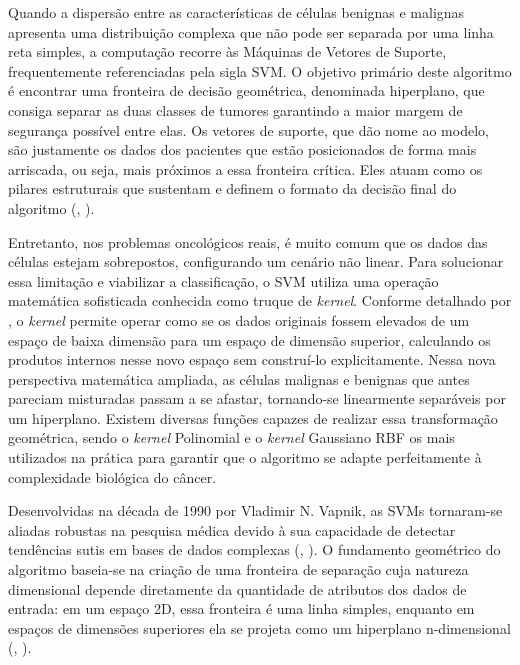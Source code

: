 \documentclass[
    12pt
    ,oneside
    ,a4paper
    ,chapter=TITLE
    ,section=TITLE
    ,sumario=abnt-6027-2012
    ,english,brazil]{abntex2} %
\begin{document}
Quando a dispersão entre as características de células benignas e malignas apresenta uma distribuição complexa que não pode ser separada por uma linha reta simples, a computação recorre às Máquinas de Vetores de Suporte, frequentemente referenciadas pela sigla SVM. O objetivo primário deste algoritmo é encontrar uma fronteira de decisão geométrica, denominada hiperplano, que consiga separar as duas classes de tumores garantindo a maior margem de segurança possível entre elas. Os vetores de suporte, que dão nome ao modelo, são justamente os dados dos pacientes que estão posicionados de forma mais arriscada, ou seja, mais próximos a essa fronteira crítica. Eles atuam como os pilares estruturais que sustentam e definem o formato da decisão final do algoritmo (, \citeyear{Bishop2006}).

Entretanto, nos problemas oncológicos reais, é muito comum que os dados das células estejam sobrepostos, configurando um cenário não linear. Para solucionar essa limitação e viabilizar a classificação, o SVM utiliza uma operação matemática sofisticada conhecida como truque de \textit{kernel}. Conforme detalhado por , o \textit{kernel} permite operar como se os dados originais fossem elevados de um espaço de baixa dimensão para um espaço de dimensão superior, calculando os produtos internos nesse novo espaço sem construí-lo explicitamente. Nessa nova perspectiva matemática ampliada, as células malignas e benignas que antes pareciam misturadas passam a se afastar, tornando-se linearmente separáveis por um hiperplano. Existem diversas funções capazes de realizar essa transformação geométrica, sendo o \textit{kernel} Polinomial e o \textit{kernel} Gaussiano RBF os mais utilizados na prática para garantir que o algoritmo se adapte perfeitamente à complexidade biológica do câncer.

Desenvolvidas na década de 1990 por Vladimir N. Vapnik, as SVMs tornaram-se aliadas robustas na pesquisa médica devido à sua capacidade de detectar tendências sutis em bases de dados complexas (, \citeyear{ibm_svm_2026}). O fundamento geométrico do algoritmo baseia-se na criação de uma fronteira de separação cuja natureza dimensional depende diretamente da quantidade de atributos dos dados de entrada: em um espaço 2D, essa fronteira é uma linha simples, enquanto em espaços de dimensões superiores ela se projeta como um hiperplano n-dimensional (, \citeyear{ibm_svm_2026}).
\end{document}
